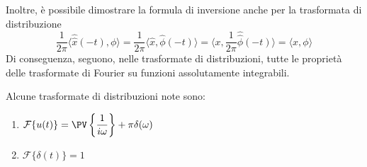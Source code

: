        Inoltre, è possibile dimostrare la formula di inversione anche per la trasformata di distribuzione
        \[
            \frac{1}{2 \pi} \langle \hat{\hat{x}}(-t), \phi \rangle = \frac{1}{2 \pi} \langle \hat{x}, \hat{\phi}(-t) \rangle = \langle x, \frac{1}{2 \pi} \hat{\hat{\phi}}(-t) \rangle = \langle x, \phi \rangle
        \]
        Di conseguenza, seguono, nelle trasformate di distribuzioni, tutte le proprietà delle trasformate di Fourier su funzioni assolutamente integrabili.

        Alcune trasformate di distribuzioni note sono:
        \begin{enumerate}
            \item $\displaystyle \mathcal{F}\{u(t)\} = \PV \left\{\frac{1}{i \omega}\right\} + \pi \delta(\omega)$
            \item $\displaystyle \mathcal{F}\{\delta(t)\} = 1$
        \end{enumerate}
